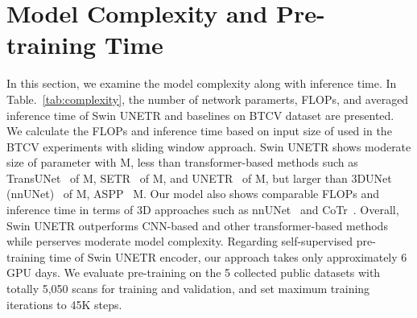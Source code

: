 \documentclass[10pt,twocolumn,letterpaper]{article}
\begin{document}
\section{Model Complexity and Pre-training Time}
\label{sec:compl_study}
In this section, we examine the model complexity along with inference time. In Table.~\ref{tab:complexity}, the number of network paramerts, FLOPs, and averaged inference time of Swin UNETR and baselines on BTCV dataset are presented. We calculate the FLOPs and inference time based on input size of  used in the BTCV experiments with sliding window approach. Swin UNETR shows moderate size of parameter with M, less than transformer-based methods such as TransUNet~\cite{chen2021transunet} of M, SETR~\cite{zheng2021rethinking} of M, and UNETR~\cite{hatamizadeh2021unetr} of M, but larger than 3DUNet (nnUNet)~\cite{isensee2021nnu} of M, ASPP~\cite{deeplabv3plus2018} M. Our model also shows comparable FLOPs and inference time in terms of 3D approaches such as nnUNet~\cite{isensee2021nnu} and CoTr~\cite{xie2021cotr}. Overall, Swin UNETR outperforms CNN-based and other transformer-based methods while perserves moderate model complexity. Regarding self-supervised pre-training time of Swin UNETR encoder, our approach takes only approximately 6 GPU days. We evaluate pre-training on the 5 collected public datasets with totally 5,050 scans for training and validation, and set maximum training iterations to 45K steps. 
\end{document}
